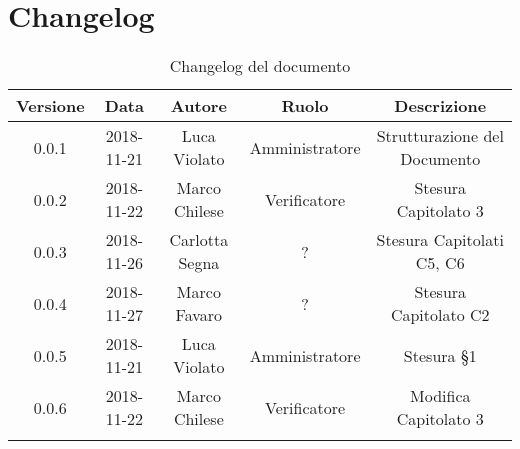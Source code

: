 \section{Changelog}

\begin{center}
\begin{longtable}{|c|c|c|c|c|}
\hline
\textbf{Versione} & \textbf{Data} & \textbf{Autore} & \textbf{Ruolo} & \textbf{Descrizione} \\
\hline \hline
\endfirsthead
0.0.1 & 2018-11-21 & Luca Violato & Amministratore & Strutturazione del Documento \\
0.0.2 & 2018-11-22 & Marco Chilese & Verificatore & Stesura Capitolato 3 \\
0.0.3 & 2018-11-26 & Carlotta Segna & ? & Stesura Capitolati C5, C6 \\
0.0.4 & 2018-11-27 & Marco Favaro & ? & Stesura Capitolato C2 \\
0.0.5 & 2018-11-21 & Luca Violato & Amministratore & Stesura §1 \\
0.0.6 & 2018-11-22 & Marco Chilese & Verificatore & Modifica Capitolato 3 \\
\hline
\caption{Changelog del documento}
\end{longtable}
\end{center}
